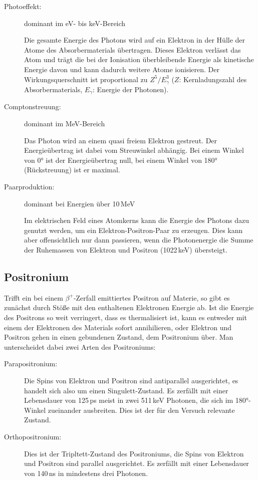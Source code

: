 \begin{description}
	\item[Photoeffekt:]\hfill
	dominant im eV- bis keV-Bereich
	
	Die gesamte Energie des Photons wird auf ein Elektron in der Hülle der Atome des Absorbermaterials übertragen. Dieses Elektron verlässt das Atom und trägt die bei der Ionisation überbleibende Energie als kinetische Energie davon und kann dadurch weitere Atome ionisieren. Der Wirkungsquerschnitt ist proportional zu $Z^5/E_\gamma^3$ ($Z$: Kernladungszahl des Absorbermaterials, $E_\gamma$: Energie der Photonen).
	
	\item[Comptonstreuung:]\hfill 
	dominant im MeV-Bereich
	
	Das Photon wird an einem quasi freiem Elektron gestreut. Der Energieübertrag ist dabei vom Streuwinkel abhängig. Bei einem Winkel von 0° ist der Energieübertrag null, bei einem Winkel von 180° (Rückstreuung) ist er maximal.
	
	\item[Paarproduktion:]\hfill 
	dominant bei Energien über 10\,MeV
	
	Im elektrischen Feld eines Atomkerns  kann die Energie des Photons dazu genutzt werden, um ein Elektron-Positron-Paar zu erzeugen. Dies kann aber offensichtlich nur dann passieren, wenn die Photonenergie die Summe der Ruhemassen von Elektron und Positron (1022\,keV) übersteigt.
\end{description}

\subsection{Positronium}

Trifft ein bei einem $\beta^+$-Zerfall emittiertes Positron auf Materie, so gibt es zunächst durch Stöße mit den enthaltenen Elektronen Energie ab. Ist die Energie des Positrons so weit verringert, dass es thermalisiert ist, kann es entweder mit einem der Elektronen des Materials sofort annihilieren, oder Elektron und Positron gehen in einen gebundenen Zustand, dem Positronium über. Man unterscheidet dabei zwei Arten des Positroniums:

\begin{description}
	\item[Parapositronium:]\hfill
	
	Die Spins von Elektron und Positron sind antiparallel ausgerichtet, es handelt sich also um einen Singulett-Zustand. Es zerfällt mit einer Lebensdauer von 125\,ps meist in zwei 511\,keV Photonen, die sich im 180°-Winkel zueinander ausbreiten. Dies ist der für den Versuch relevante Zustand.
	
	\item[Orthopositronium:]\hfill 
	
	Dies ist der Tripltett-Zustand des Positroniums, die Spins von Elektron und Positron sind parallel ausgerichtet. Es zerfällt mit einer Lebensdauer von 140\,ns in mindestens drei Photonen.
	
\end{description}

